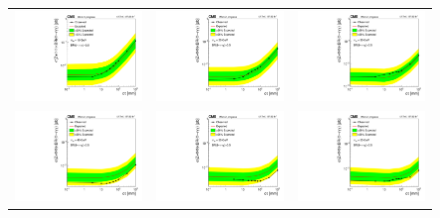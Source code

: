 \begin{figure}[htb!]
	\centering
	\begin{tabular}{c c c}
	\includegraphics[width=0.31\linewidth]{figs/05_analysis/limitVsCtau_ZH_m15_Run2_modelIndependent.pdf} &
	\includegraphics[width=0.31\linewidth]{figs/05_analysis/limitVsCtau_ZH_m20_Run2_modelIndependent.pdf} &
	\includegraphics[width=0.31\linewidth]{figs/05_analysis/limitVsCtau_ZH_m30_Run2_modelIndependent.pdf} \\
	\includegraphics[width=0.31\linewidth]{figs/05_analysis/limitVsCtau_ZH_m40_Run2_modelIndependent.pdf} &
	\includegraphics[width=0.31\linewidth]{figs/05_analysis/limitVsCtau_ZH_m50_Run2_modelIndependent.pdf} &
	\includegraphics[width=0.31\linewidth]{figs/05_analysis/limitVsCtau_ZH_m55_Run2_modelIndependent.pdf}\\

\end{tabular}
\end{figure}
